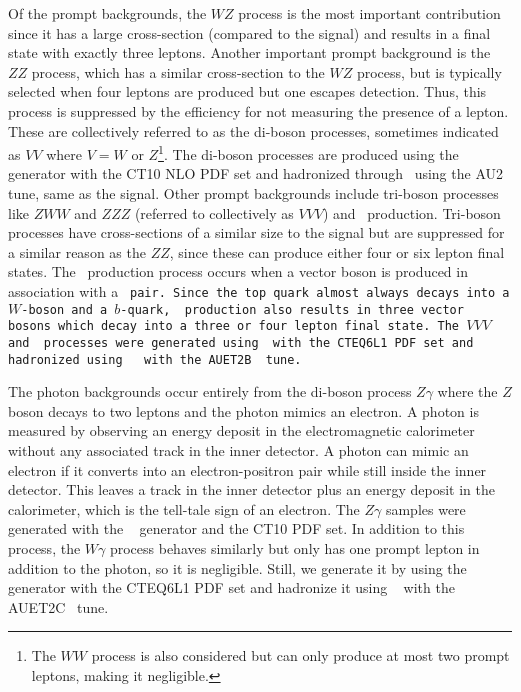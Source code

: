 Of the prompt backgrounds,
the $WZ$ process is the most important contribution since it has a 
large cross-section (compared to the signal)
and results in a final state with exactly three leptons. Another important 
prompt background is the $ZZ$ process,
which has a similar cross-section to the $WZ$ process, but is typically 
selected when 
four leptons are produced but one escapes detection.
Thus, this process is suppressed by the 
efficiency for not measuring the presence of a lepton. 
These are collectively referred to as the di-boson processes, sometimes
indicated as $VV$ where $V = W$ or $Z$\footnote{The $WW$ process is also considered
but can only produce at most two prompt leptons, making it negligible.}. 
The di-boson processes are produced using the 
\powheg~\cite{Alioli:2008gx,Nason:2004rx,Frixione:2007vw,Alioli:2010xd} generator
with the CT10 NLO PDF set and 
hadronized through \pythiaeight~using the AU2 tune, same as the signal.
Other prompt backgrounds 
include tri-boson processes like $ZWW$ and $ZZZ$ 
(referred to collectively as $VVV$)
and \ttV~production. Tri-boson processes
have cross-sections of a similar size to the signal but are suppressed 
for a similar reason
as the $ZZ$, since these can produce either four or six lepton final 
states. 
The \ttV~production process occurs when a vector
boson is produced in association with a \tt~pair. 
Since the top quark almost always decays
into a $W$-boson and a $b$-quark, \ttV~production also results in 
three vector bosons which decay into a three or four lepton
final state.
The $VVV$ and \ttV~processes were generated using \madgraph~with the 
CTEQ6L1 PDF set and hadronized
using \pythiasix~\cite{PYTHIA} with the AUET2B~\cite{atlas:2011zja} 
tune.

The photon backgrounds occur entirely from the di-boson process $Z\gamma$
where the $Z$ boson decays to two leptons and the photon mimics an electron.
A photon is measured
by observing an energy deposit in the electromagnetic calorimeter 
without any associated track in the inner detector.
A photon can mimic an electron
if it converts into an electron-positron
pair while still inside the inner detector. This leaves a track 
in the inner detector plus an energy deposit in the 
calorimeter, which is the tell-tale sign of an electron.
The $Z\gamma$ samples were generated with the \sherpa~\cite{sherpa} generator 
and the CT10 PDF set.  %
In addition to this process, the $W\gamma$ process behaves similarly 
but only has one prompt lepton in addition to the photon, so it is negligible.
Still, we generate it by using
the \alpgen~\cite{ALPGEN} generator with the CTEQ6L1 PDF set
and hadronize it using \jimmy~\cite{Jimmy} with the AUET2C~\cite{atlas:2011zja} 
tune.

